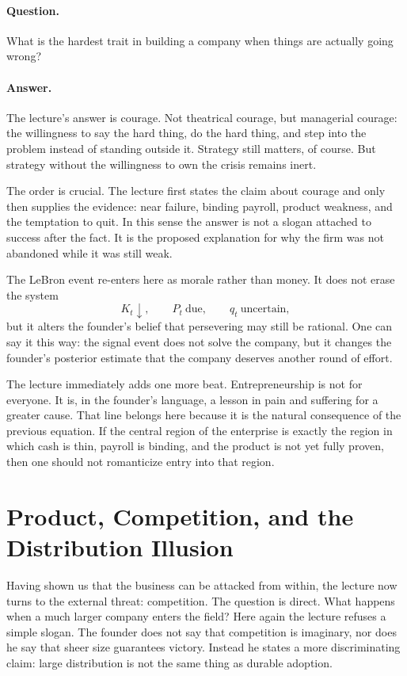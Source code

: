\paragraph{Question.} What is the hardest trait in building a company when things are actually going wrong?

\paragraph{Answer.} The lecture's answer is courage. Not theatrical courage, but managerial courage: the willingness to say the hard thing, do the hard thing, and step into the problem instead of standing outside it. Strategy still matters, of course. But strategy without the willingness to own the crisis remains inert.

The order is crucial. The lecture first states the claim about courage and only then supplies the evidence: near failure, binding payroll, product weakness, and the temptation to quit. In this sense the answer is not a slogan attached to success after the fact. It is the proposed explanation for why the firm was not abandoned while it was still weak.

The LeBron event re-enters here as morale rather than money. It does not erase the system
\[
K_t \downarrow,\qquad P_t\ \text{due},\qquad q_t\ \text{uncertain},
\]
but it alters the founder's belief that persevering may still be rational. One can say it this way: the signal event does not solve the company, but it changes the founder's posterior estimate that the company deserves another round of effort.

The lecture immediately adds one more beat. Entrepreneurship is not for everyone. It is, in the founder's language, a lesson in pain and suffering for a greater cause. That line belongs here because it is the natural consequence of the previous equation. If the central region of the enterprise is exactly the region in which cash is thin, payroll is binding, and the product is not yet fully proven, then one should not romanticize entry into that region.

\section{Product, Competition, and the Distribution Illusion}

Having shown us that the business can be attacked from within, the lecture now turns to the external threat: competition. The question is direct. What happens when a much larger company enters the field? Here again the lecture refuses a simple slogan. The founder does not say that competition is imaginary, nor does he say that sheer size guarantees victory. Instead he states a more discriminating claim: large distribution is not the same thing as durable adoption.

